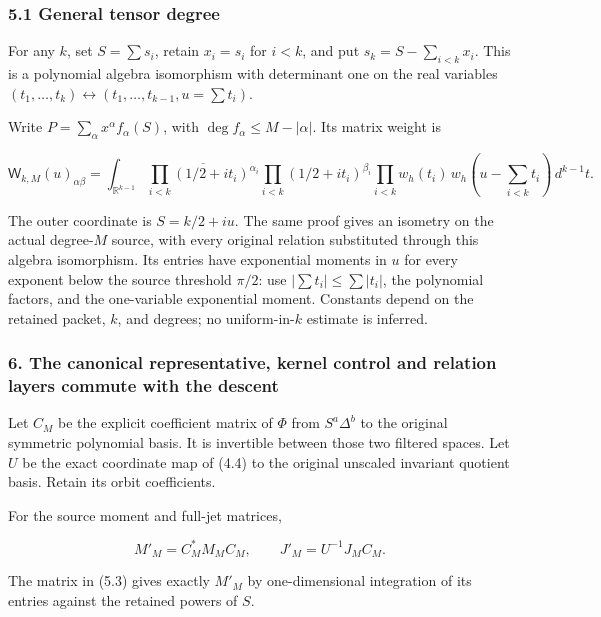 \subsubsection{5.1 General tensor degree}\label{spectral_sum_full:general-tensor-degree}

For any \(k\), set \(S=\sum s_i\), retain \(x_i=s_i\) for \(i<k\), and
put \(s_k=S-\sum_{i<k}x_i\). This is a polynomial algebra isomorphism
with determinant one on the real variables
\((t_1,\ldots,t_k)\leftrightarrow(t_1,\ldots,t_{k-1},u=\sum t_i)\).

Write \(P=\sum_\alpha x^\alpha f_\alpha(S)\), with
\(\deg f_\alpha\le M-|\alpha|\). Its matrix weight is

\[\mathsf W_{k,M}(u)_{\alpha\beta}
=\int_{\mathbb R^{k-1}}\overline{\prod_{i<k}(1/2+it_i)^{\alpha_i}}
\prod_{i<k}(1/2+it_i)^{\beta_i}
\prod_{i<k}w_h(t_i)\,w_h(u-\sum_{i<k}t_i)\,d^{k-1}t.\tag{5.6}\]

The outer coordinate is \(S=k/2+iu\). The same proof gives an isometry
on the actual degree-\(M\) source, with every original relation
substituted through this algebra isomorphism. Its entries have
exponential moments in \(u\) for every exponent below the source
threshold \(\pi/2\): use \(|\sum t_i|\le\sum|t_i|\), the polynomial
factors, and the one-variable exponential moment. Constants depend on
the retained packet, \(k\), and degrees; no uniform-in-\(k\) estimate is
inferred.

\subsubsection{6. The canonical representative, kernel control and relation
layers commute with the
descent}\label{spectral_sum_full:the-canonical-representative-kernel-control-and-relation-layers-commute-with-the-descent}

Let \(C_M\) be the explicit coefficient matrix of \(\Phi\) from
\(S^a\Delta^b\) to the original symmetric polynomial basis. It is
invertible between those two filtered spaces. Let \(U\) be the exact
coordinate map of (4.4) to the original unscaled invariant quotient
basis. Retain its orbit coefficients.

For the source moment and full-jet matrices,

\[M'_M=C_M^*M_M C_M,\qquad J'_M=U^{-1}J_MC_M.\tag{6.1}\]

The matrix in (5.3) gives exactly \(M'_M\) by one-dimensional
integration of its entries against the retained powers of \(S\).


